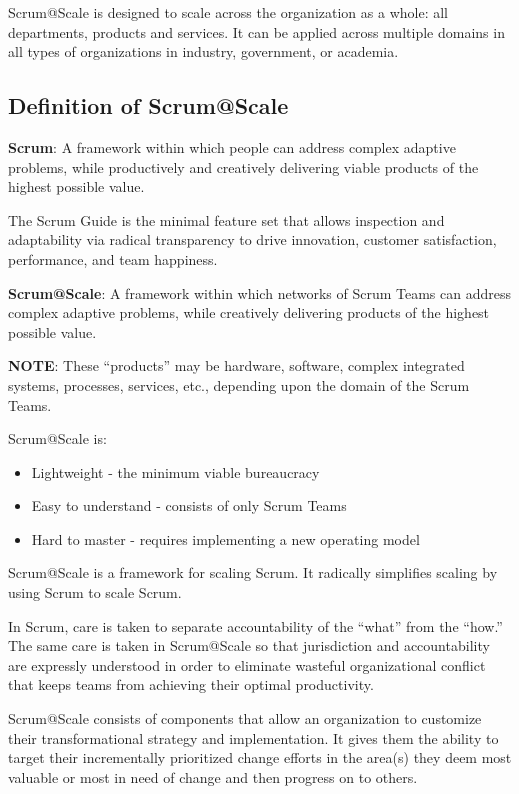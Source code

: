 \documentclass[12pt,a4paper,parskip=full]{scrartcl}
\begin{document}
Scrum@Scale is designed to scale across the organization as a whole: all departments, products and services. It can be applied across multiple domains in all types of organizations in industry, government, or academia.

\subsection{Definition of Scrum@Scale}

\textbf{Scrum}: A framework within which people can address complex adaptive problems, while productively and creatively delivering viable products of the highest possible value.

The Scrum Guide is the minimal feature set that allows inspection and adaptability via radical transparency to drive innovation, customer satisfaction, performance, and team happiness.

\textbf{Scrum@Scale}: A framework within which networks of Scrum Teams can address complex adaptive problems, while creatively delivering products of the highest possible value.

\textbf{NOTE}: These ``products'' may be hardware, software, complex integrated systems, processes, services, etc., depending upon the domain of the Scrum Teams.

Scrum@Scale is:
\begin{itemize}
	\item Lightweight - the minimum viable bureaucracy
	\item Easy to understand - consists of only Scrum Teams
	\item Hard to master - requires implementing a new operating model
\end{itemize}

Scrum@Scale is a framework for scaling Scrum. It radically simplifies scaling by using Scrum to scale Scrum. 

In Scrum, care is taken to separate accountability of the ``what'' from the ``how.'' The same care is taken in Scrum@Scale so that jurisdiction and accountability are expressly understood in order to eliminate wasteful organizational conflict that keeps teams from achieving their optimal productivity.

Scrum@Scale consists of components that allow an organization to customize their transformational strategy and implementation. It gives them the ability to target their incrementally prioritized change efforts in the area(s) they deem most valuable or most in need of change and then progress on to others.
\end{document}

